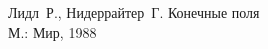 \clearpage
\begin{thebibliography}{9}

Лидл~Р., Нидеррайтер~Г. Конечные поля\\
{\small М.: Мир, 1988}
\end{thebibliography}
